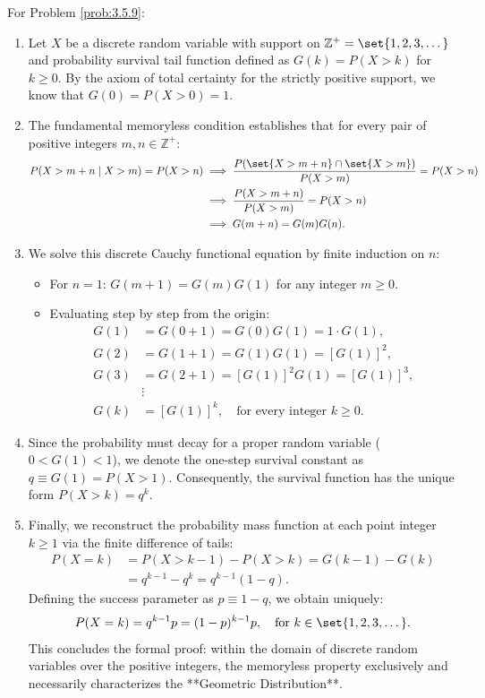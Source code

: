 \begin{solucion}
	\label{sol:3.5.9}
	For Problem \ref{prob:3.5.9}:
	\begin{enumerate}
		\item Let $X$ be a discrete random variable with support on $\mathbb{Z}^+ = \set{1, 2, 3, \dots}$ and probability survival tail function defined as $G(k) = P(X > k)$ for $k \ge 0$. By the axiom of total certainty for the strictly positive support, we know that $G(0) = P(X > 0) = 1$.
		\item The fundamental memoryless condition establishes that for every pair of positive integers $m, n \in \mathbb{Z}^+$:
		\begin{align*}
			P(X > m+n \mid X > m) = P(X > n) &\implies \dfrac{P(\set{X > m+n} \cap \set{X > m})}{P(X > m)} = P(X > n) \\
			&\implies \dfrac{P(X > m+n)}{P(X > m)} = P(X > n) \\
			&\implies G(m+n) = G(m) G(n).
		\end{align*}
		\item We solve this discrete Cauchy functional equation by finite induction on $n$:
		\begin{itemize}
			\item For $n = 1$: $G(m+1) = G(m) G(1)$ for any integer $m \ge 0$.
			\item Evaluating step by step from the origin:
			\begin{align*}
				G(1) &= G(0+1) = G(0) G(1) = 1 \cdot G(1), \\
				G(2) &= G(1+1) = G(1) G(1) = [G(1)]^2, \\
				G(3) &= G(2+1) = [G(1)]^2 G(1) = [G(1)]^3, \\
				&\vdots \\
				G(k) &= [G(1)]^k, \quad \text{for every integer } k \ge 0.
			\end{align*}
		\end{itemize}
		\item Since the probability must decay for a proper random variable ($0 < G(1) < 1$), we denote the one-step survival constant as $q \equiv G(1) = P(X > 1)$. Consequently, the survival function has the unique form $P(X > k) = q^k$.
		\item Finally, we reconstruct the probability mass function at each point integer $k \ge 1$ via the finite difference of tails:
		\begin{align*}
			P(X = k) &= P(X > k-1) - P(X > k) = G(k-1) - G(k) \\
			&= q^{k-1} - q^k = q^{k-1}(1 - q).
		\end{align*}
		Defining the success parameter as $p \equiv 1 - q$, we obtain uniquely:
		\begin{align*}
			P(X = k) = q^{k-1} p = (1-p)^{k-1} p, \quad \text{for } k \in \set{1, 2, 3, \dots}.
		\end{align*}
		This concludes the formal proof: within the domain of discrete random variables over the positive integers, the memoryless property exclusively and necessarily characterizes the **Geometric Distribution**.
	\end{enumerate}
\end{solucion}

